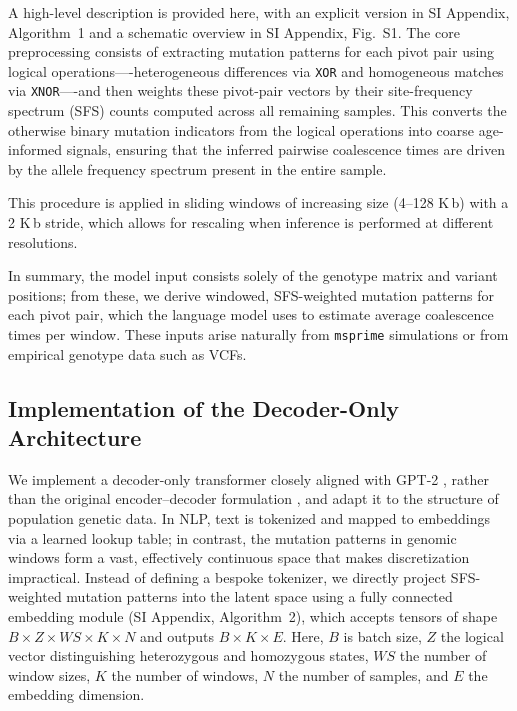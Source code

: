 \documentclass[9pt,twocolumn,twoside]{pnas-new}
\begin{document}
{A high-level description is provided here, 
with an explicit version in SI Appendix, Algorithm~1 
and a schematic overview in SI Appendix, Fig.~S1. 
The core preprocessing consists of extracting mutation patterns for each pivot pair
using logical operations—-heterogeneous differences via \texttt{XOR} 
and homogeneous matches via \texttt{XNOR}—-and then weights these pivot-pair vectors
by their site-frequency spectrum (SFS) counts computed across all remaining samples. 
This converts the otherwise binary mutation indicators from the logical operations
into coarse age-informed signals, 
ensuring that the inferred pairwise coalescence times are driven 
by the allele frequency spectrum present in the entire sample.

This procedure is applied in sliding windows of increasing size (4–128 K\,b)
with a 2 K\,b stride, which allows for rescaling when
inference is performed at different resolutions. 

In summary, the model input consists solely of the genotype matrix and variant positions; 
from these, we derive windowed, SFS-weighted mutation patterns for each pivot pair, 
which the language model uses to estimate average coalescence times per window. 
These inputs arise naturally from \texttt{msprime} simulations or from empirical genotype data such as VCFs.


\subsection*{Implementation of the Decoder-Only Architecture}

We implement a decoder-only transformer closely aligned with GPT-2 \cite{radford_language_2019}, 
rather than the original encoder–decoder formulation \cite{vaswani_attention_2017}, 
and adapt it to the structure of population genetic data. 
In NLP, text is tokenized and mapped to embeddings via a learned lookup table; 
in contrast, the mutation patterns in genomic windows form a vast,
effectively continuous space that makes discretization impractical. 
Instead of defining a bespoke tokenizer,
we directly project SFS-weighted mutation patterns into the latent space using a fully connected embedding module (SI Appendix, Algorithm~2),
which accepts tensors of shape $B \times Z \times WS \times K \times N$ and outputs $B \times K \times E$. 
Here, $B$ is batch size, $Z$ the logical vector distinguishing heterozygous and homozygous states, $WS$ the number of window sizes, $K$ the number of windows, $N$ the number of samples, and $E$ the embedding dimension.

}
\end{document}
